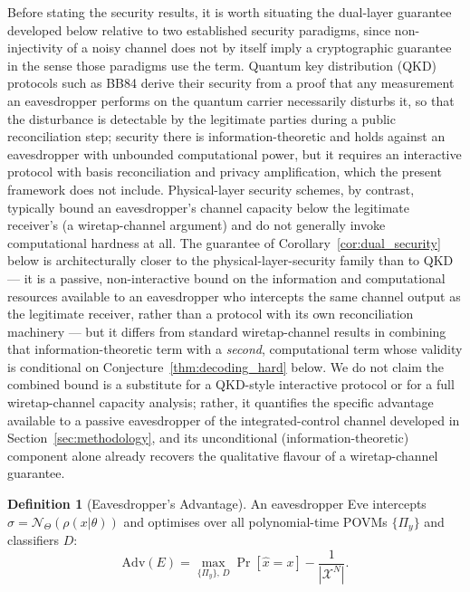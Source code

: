 \documentclass[journal,twocolumn]{IEEEtran}
\theoremstyle{definition}
\newtheorem{definition}{Definition}[section]
\theoremstyle{plain}
\begin{document}
Before stating the security results, it is worth situating the
dual-layer guarantee developed below relative to two established
security paradigms, since non-injectivity of a noisy channel does
not by itself imply a cryptographic guarantee in the sense those
paradigms use the term. Quantum key distribution (QKD) protocols
such as BB84 derive their security from a proof that any measurement
an eavesdropper performs on the quantum carrier necessarily disturbs
it, so that the disturbance is detectable by the legitimate parties
during a public reconciliation step; security there is
information-theoretic and holds against an eavesdropper with
unbounded computational power, but it requires an interactive
protocol with basis reconciliation and privacy amplification, which
the present framework does not include. Physical-layer security
schemes, by contrast, typically bound an eavesdropper's channel
capacity below the legitimate receiver's (a wiretap-channel
argument) and do not generally invoke computational hardness at all.
The guarantee of Corollary~\ref{cor:dual_security} below is
architecturally closer to the physical-layer-security family than to
QKD --- it is a passive, non-interactive bound on the information
and computational resources available to an eavesdropper who
intercepts the same channel output as the legitimate receiver,
rather than a protocol with its own reconciliation machinery --- but
it differs from standard wiretap-channel results in combining that
information-theoretic term with a \emph{second}, computational term
whose validity is conditional on Conjecture~\ref{thm:decoding_hard}
below. We do not claim the combined bound is a substitute for a
QKD-style interactive protocol or for a full wiretap-channel capacity
analysis; rather, it quantifies the specific advantage available to
a passive eavesdropper of the integrated-control channel developed
in Section~\ref{sec:methodology}, and its unconditional
(information-theoretic) component alone already recovers the
qualitative flavour of a wiretap-channel guarantee.

\begin{definition}[Eavesdropper's Advantage]
\label{def:adv}
An eavesdropper Eve intercepts $\sigma = \mathcal{N}_\Theta(\rho(x|\theta))$
and optimises over all polynomial-time POVMs $\{\Pi_y\}$ and
classifiers $D$:
\begin{equation}
  \mathrm{Adv}(E) = \max_{\{\Pi_y\},\,D}
  \Pr[\hat x = x] - \frac{1}{|\mathcal{X}^N|}.
  \label{eq:adv_def}
\end{equation}
\end{definition}
\end{document}
